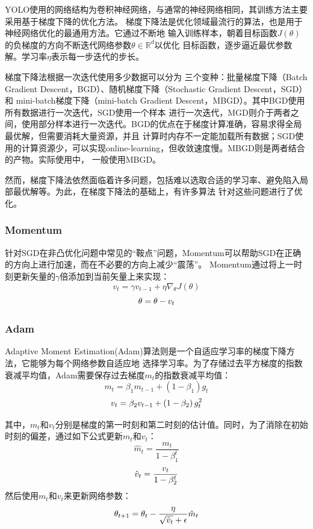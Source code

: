 YOLO使用的网络结构为卷积神经网络，与通常的神经网络相同，其训练方法主要采用基于梯度下降的优化方法。
梯度下降法是优化领域最流行的算法，也是用于神经网络优化的最通用方法。它通过不断地
输入训练样本，朝着目标函数$J(\theta)$的负梯度的方向不断迭代网络参数$\theta \in \mathbb{R}^{d}$以优化
目标函数，逐步逼近最优参数解。学习率$\eta$表示每一步迭代的步长。

梯度下降法根据一次迭代使用多少数据可以分为
三个变种：批量梯度下降（Batch Gradient Descent，BGD）、随机梯度下降（Stochastic Gradient Descent，SGD）和
mini-batch梯度下降（mini-batch Gradient Descent，MBGD）。其中BGD使用所有数据进行一次迭代，SGD使用一个样本
进行一次迭代，MGD则介于两者之间，使用部分样本进行一次迭代。BGD的优点在于梯度计算准确，容易求得全局最优解，但需要消耗大量资源，并且
计算时内存不一定能加载所有数据；SGD使用的计算资源少，可以实现online-learning，但收敛速度慢。MBGD则是两者结合的产物。实际使用中，
一般使用MBGD。

然而，梯度下降法依然面临着许多问题，包括难以选取合适的学习率、避免陷入局部最优解等。为此，在梯度下降法的基础上，有许多算法
针对这些问题进行了优化。

\subsubsection{Momentum}
针对SGD在非凸优化问题中常见的“鞍点”问题，Momentum\cite{Momentum}可以帮助SGD在正确的方向上进行加速，而在不必要的方向上减少“震荡”。
Momentum通过将上一时刻更新矢量的$\gamma$倍添加到当前矢量上来实现：
$$v _ { t }  = \gamma v _ { t - 1 } + \eta \nabla _ { \theta } J ( \theta )$$
\begin{equation}
    \centering
    \theta  = \theta - v _ { t }
    \label{Momentum_F}
\end{equation}

\subsubsection{Adam}
Adaptive Moment Estimation(Adam)\cite{Adam}算法则是一个自适应学习率的梯度下降方法，它能够为每个网络参数自适应地
选择学习率。为了存储过去平方梯度的指数衰减平均值，Adam需要保存过去梯度$m_t$的指数衰减平均值：
$$m _ { t }  = \beta _ { 1 } m _ { t - 1 } + \left( 1 - \beta _ { 1 } \right) g _ { t }$$
\begin{equation}
    \centering
    v _ { t }  = \beta _ { 2 } v _ { t - 1 } + \left( 1 - \beta _ { 2 } \right) g _ { t } ^ { 2 } 
    \label{Adam_F_1}
\end{equation}

其中，$m_t$和$v_t$分别是梯度的第一时刻和第二时刻的估计值。同时，为了消除在初始时刻的偏差，通过如下公式更新$m_t$和$v_t$：
$$\hat { m } _ { t }  = \frac { m _ { t } } { 1 - \beta _ { 1 } ^ { t } } $$
\begin{equation}
    \centering
    \hat { v } _ { t }  = \frac { v _ { t } } { 1 - \beta _ { 2 } ^ { t } }
    \label{Adam_F_2}
\end{equation}
然后使用$m_t$和$v_t$来更新网络参数：
\begin{equation}
    \centering
    \theta _ { t + 1 } = \theta _ { t } - \frac { \eta } { \sqrt { \hat { v } _ { t } } + \epsilon } \hat { m } _ { t }
    \label{Adam_F_3}
\end{equation}

